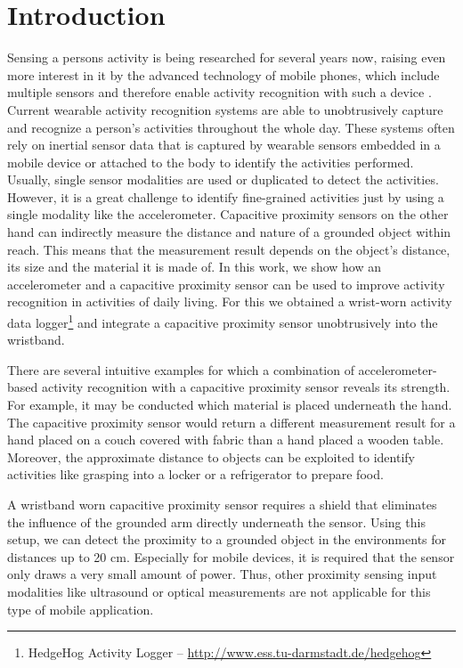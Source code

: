 \documentclass[runningheads,a4paper]{llncs}
\begin{document}
\section{Introduction}

Sensing a persons activity is being researched for several years now, raising even more interest in it by the advanced technology of mobile phones, which include multiple sensors and therefore enable activity recognition with such a device \cite{brezmes2009activity}. Current wearable activity recognition systems are able to unobtrusively capture and recognize a person's activities throughout the whole day. These systems often rely on inertial sensor data that is captured by wearable sensors embedded in a mobile device \cite{brezmes2009activity} or attached to the body \cite{Ravi2005} to identify the activities performed. Usually, single sensor modalities are used or duplicated to detect the activities. However, it is a great challenge to identify fine-grained activities just by using a single modality like the accelerometer. Capacitive proximity sensors on the other hand can indirectly measure the distance and nature of a grounded object within reach. This means that the measurement result depends on the 
object's distance, its size and the material it is made of. In this work, we show how an accelerometer and a capacitive proximity sensor can be used to improve activity recognition in activities of daily living. For this we obtained a wrist-worn activity data logger\footnote{HedgeHog Activity Logger -- \url{http://www.ess.tu-darmstadt.de/hedgehog}} and integrate a capacitive proximity sensor unobtrusively into the wristband.

There are several intuitive examples for which a combination of accelerometer-based activity recognition with a capacitive proximity sensor reveals its strength. For example, it may be conducted which material is placed underneath the hand. The capacitive proximity sensor would return a different measurement result for a hand placed on a couch covered with fabric than a hand placed a wooden table. Moreover, the approximate distance to objects can be exploited to identify activities like grasping into a locker or a refrigerator to prepare food.

A wristband worn capacitive proximity sensor requires a shield that eliminates the influence of the grounded arm directly underneath the sensor. Using this setup, we can detect the proximity to a grounded object in the environments for distances up to 20 cm. Especially for mobile devices, it is required that the sensor only draws a very small amount of power. Thus, other proximity sensing input modalities like ultrasound or optical measurements are not applicable for this type of mobile application.
\end{document}
